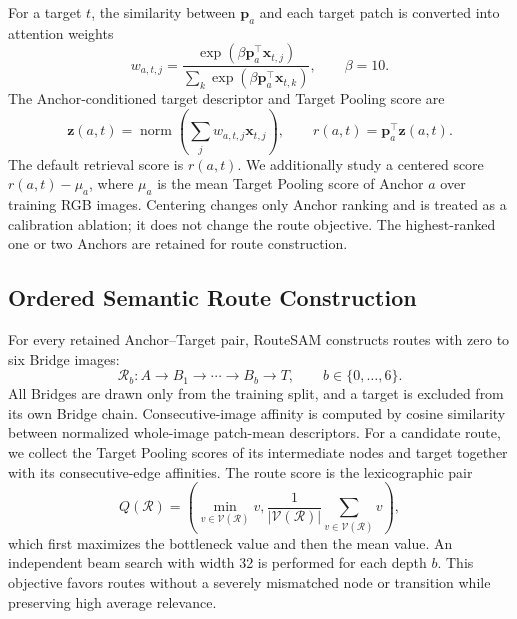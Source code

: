 \documentclass[a4paper,fleqn]{cas-dc}
\begin{document}
For a target $t$, the similarity between $\mathbf{p}_a$ and each target patch is converted into attention weights
\begin{equation}
w_{a,t,j}=\frac{\exp(\beta\mathbf{p}_a^{\top}\mathbf{x}_{t,j})}
{\sum_k\exp(\beta\mathbf{p}_a^{\top}\mathbf{x}_{t,k})},
\qquad \beta=10.
\end{equation}
The Anchor-conditioned target descriptor and Target Pooling score are
\begin{equation}
\mathbf{z}(a,t)=\operatorname{norm}\left(\sum_jw_{a,t,j}\mathbf{x}_{t,j}\right),
\qquad
r(a,t)=\mathbf{p}_a^{\top}\mathbf{z}(a,t).
\end{equation}
The default retrieval score is $r(a,t)$. We additionally study a centered score $r(a,t)-\mu_a$, where $\mu_a$ is the mean Target Pooling score of Anchor $a$ over training RGB images. Centering changes only Anchor ranking and is treated as a calibration ablation; it does not change the route objective. The highest-ranked one or two Anchors are retained for route construction.

\subsection{Ordered Semantic Route Construction}\label{sec:route-construction}

For every retained Anchor--Target pair, RouteSAM constructs routes with zero to six Bridge images:
\begin{equation}
\mathcal{R}_{b}: A\rightarrow B_1\rightarrow\cdots\rightarrow B_b\rightarrow T,
\qquad b\in\{0,\ldots,6\}.
\end{equation}
All Bridges are drawn only from the training split, and a target is excluded from its own Bridge chain. Consecutive-image affinity is computed by cosine similarity between normalized whole-image patch-mean descriptors. For a candidate route, we collect the Target Pooling scores of its intermediate nodes and target together with its consecutive-edge affinities. The route score is the lexicographic pair
\begin{equation}
Q(\mathcal{R})=\left(\min_{v\in\mathcal{V}(\mathcal{R})}v,
\frac{1}{|\mathcal{V}(\mathcal{R})|}\sum_{v\in\mathcal{V}(\mathcal{R})}v\right),
\end{equation}
which first maximizes the bottleneck value and then the mean value. An independent beam search with width 32 is performed for each depth $b$. This objective favors routes without a severely mismatched node or transition while preserving high average relevance.
\end{document}
